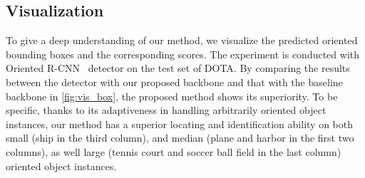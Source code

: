 \begin{table}[t]
\begin{center}
\end{center}
\vspace{-0.2cm}
\caption{Ablation studies on the structure of the routing function. \emph{Adaptive combination} means using the combination weights prediction branch to adaptively combine the weight of each kernel, and \emph{spatial encoding} refers to adding a DWConv-LN-ReLU module before the average pooling layer.}
\label{tab:router}
\vspace{-0.4cm}
\end{table}


\subsection{Visualization}
\label{sec:exp_vis}


To give a deep understanding of our method, we visualize the predicted oriented bounding boxes and the corresponding scores. The experiment is conducted with Oriented R-CNN~\cite{xie2021oriented} detector on the test set of DOTA. By comparing the results between the detector with our proposed backbone and that with the baseline backbone in \cref{fig:vis_box}, the proposed method shows its superiority. To be specific, thanks to its adaptiveness in handling arbitrarily oriented object instances, our method has a superior locating and identification ability on both small (\eg ship in the third column), and median (\eg plane and harbor in the first two columns), as well large (\eg tennis court and soccer ball field in the last column) oriented object instances.
